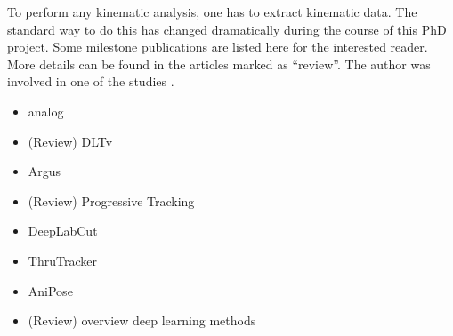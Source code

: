 To perform any kinematic analysis, one has to extract kinematic data.
The standard way to do this has changed dramatically during the course of this PhD project.
Some milestone publications are listed here for the interested reader.
More details can be found in the articles marked as ``review''.
The author was involved in one of the studies \citep{MMielke2020}.

\begin{itemize}
\item analog \citep[e.g.][]{Bernstein1927b}
\item (Review) DLTv \citep{Hedrick2008}
\item Argus \citep{Jackson2016}
\item (Review) Progressive Tracking \citep{MMielke2020}
\item DeepLabCut \citep{Mathis2018,Mathis2020}
\item ThruTracker \citep{Corcoran2021}
\item AniPose \citep{Karashchuk2021}
\item (Review) overview deep learning methods \citep{Cronin2021}
\end{itemize}
